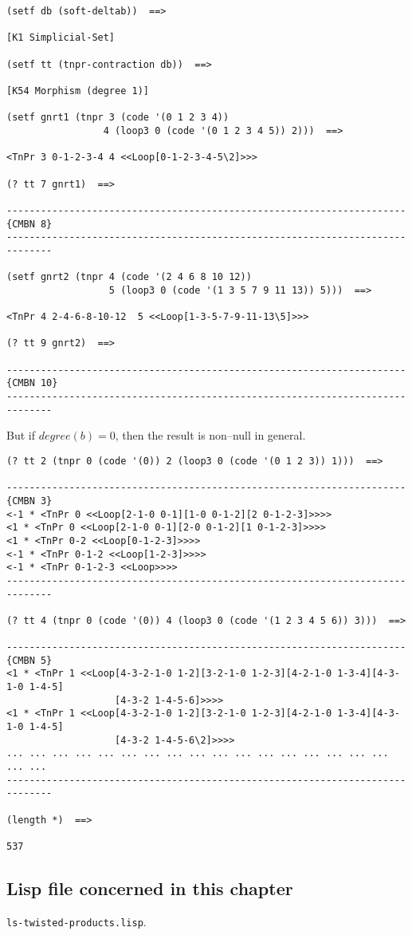 {\footnotesize\begin{verbatim}
(setf db (soft-deltab))  ==>

[K1 Simplicial-Set]
 
(setf tt (tnpr-contraction db))  ==>

[K54 Morphism (degree 1)]

(setf gnrt1 (tnpr 3 (code '(0 1 2 3 4)) 
                 4 (loop3 0 (code '(0 1 2 3 4 5)) 2)))  ==>

<TnPr 3 0-1-2-3-4 4 <<Loop[0-1-2-3-4-5\2]>>>

(? tt 7 gnrt1)  ==>

----------------------------------------------------------------------{CMBN 8}
------------------------------------------------------------------------------

(setf gnrt2 (tnpr 4 (code '(2 4 6 8 10 12))  
                  5 (loop3 0 (code '(1 3 5 7 9 11 13)) 5)))  ==>

<TnPr 4 2-4-6-8-10-12  5 <<Loop[1-3-5-7-9-11-13\5]>>>

(? tt 9 gnrt2)  ==>

----------------------------------------------------------------------{CMBN 10}
------------------------------------------------------------------------------
\end{verbatim}}
\newpage
But if $degree(b) = 0$, then the result is non--null in general.
{\footnotesize\begin{verbatim}
(? tt 2 (tnpr 0 (code '(0)) 2 (loop3 0 (code '(0 1 2 3)) 1)))  ==>

----------------------------------------------------------------------{CMBN 3}
<-1 * <TnPr 0 <<Loop[2-1-0 0-1][1-0 0-1-2][2 0-1-2-3]>>>>
<1 * <TnPr 0 <<Loop[2-1-0 0-1][2-0 0-1-2][1 0-1-2-3]>>>>
<1 * <TnPr 0-2 <<Loop[0-1-2-3]>>>>
<-1 * <TnPr 0-1-2 <<Loop[1-2-3]>>>>
<-1 * <TnPr 0-1-2-3 <<Loop>>>>
------------------------------------------------------------------------------

(? tt 4 (tnpr 0 (code '(0)) 4 (loop3 0 (code '(1 2 3 4 5 6)) 3)))  ==>

----------------------------------------------------------------------{CMBN 5}
<1 * <TnPr 1 <<Loop[4-3-2-1-0 1-2][3-2-1-0 1-2-3][4-2-1-0 1-3-4][4-3-1-0 1-4-5]
                   [4-3-2 1-4-5-6]>>>>
<1 * <TnPr 1 <<Loop[4-3-2-1-0 1-2][3-2-1-0 1-2-3][4-2-1-0 1-3-4][4-3-1-0 1-4-5]
                   [4-3-2 1-4-5-6\2]>>>>
... ... ... ... ... ... ... ... ... ... ... ... ... ... ... ... ... ... ... 
------------------------------------------------------------------------------

(length *)  ==>

537
\end{verbatim}}

\subsection* {Lisp file concerned in this chapter}

{\tt ls-twisted-products.lisp}.

